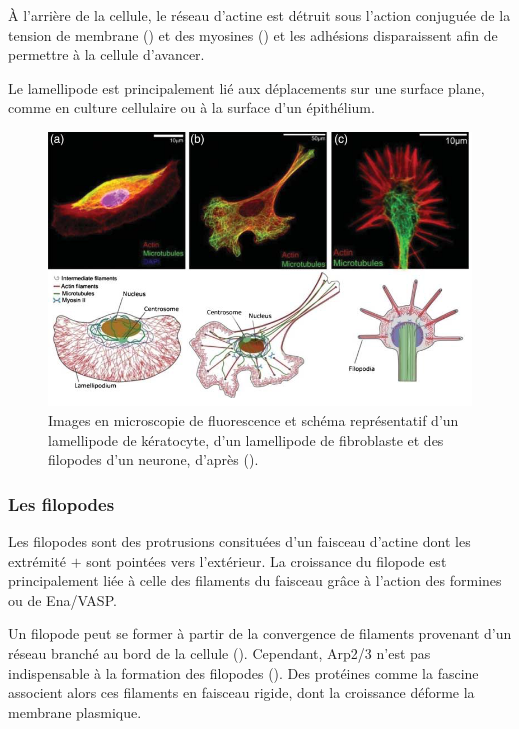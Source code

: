 \documentclass{report}
\begin{document}
À l'arrière de la cellule, le réseau d'actine est détruit sous l'action conjuguée de la tension de membrane (\cite{raucher_cell_2000}) et des myosines (\cite{wilson_myosin_2010}) et les adhésions disparaissent afin de permettre à la cellule d'avancer.

Le lamellipode est principalement lié aux déplacements sur une surface plane, comme en culture cellulaire ou à la surface d'un épithélium. 

\begin{figure}
\includegraphics[scale=0.5]{Figures/lamellipode.png}
\caption{Images en microscopie de fluorescence et schéma représentatif d'un lamellipode de kératocyte, d'un lamellipode de fibroblaste et des filopodes d'un neurone, d'après (\cite{huber_emergent_2013}). } 
\end{figure}


\subsubsection{Les filopodes}

Les filopodes sont des protrusions consituées d'un faisceau d'actine dont les extrémité $+$ sont pointées vers l'extérieur. 
La croissance du filopode est principalement liée à celle des filaments du faisceau grâce à l'action des formines ou de Ena/VASP. 

Un filopode peut se former à partir de la convergence de filaments provenant d'un réseau branché au bord de la cellule (\cite{small_actin_1995}). Cependant, Arp2/3 n'est pas indispensable à la formation des filopodes (\cite{wu_arp2/3_2012}). 
Des protéines comme la fascine associent alors ces filaments en faisceau rigide, dont la croissance déforme la membrane plasmique. 
\end{document}

